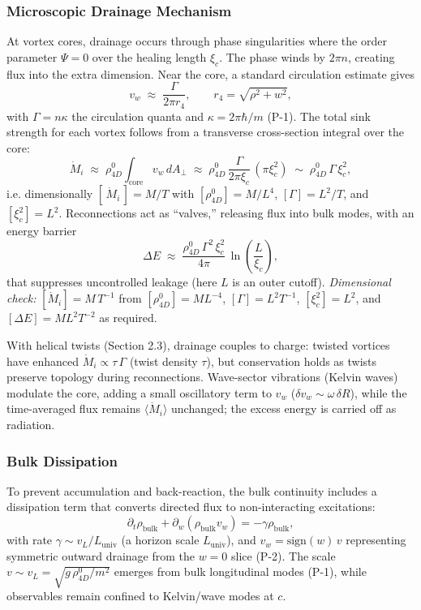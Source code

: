 \subsubsection{Microscopic Drainage Mechanism}
At vortex cores, drainage occurs through phase singularities where the order parameter $\Psi=0$ over the healing length $\xi_c$. The phase winds by $2\pi n$, creating flux into the extra dimension. Near the core, a standard circulation estimate gives
\begin{equation}
v_w \;\approx\; \frac{\Gamma}{2\pi r_4},\qquad r_4=\sqrt{\rho^2+w^2},
\end{equation}
with $\Gamma=n\kappa$ the circulation quanta and $\kappa=2\pi\hbar/m$ (P-1). The total sink strength for each vortex follows from a transverse cross-section integral over the core:
\begin{equation}
\dot M_i \;\approx\; \rho_{4D}^0 \int_{\text{core}} v_w\, dA_\perp
\;\approx\; \rho_{4D}^0\,\frac{\Gamma}{2\pi \xi_c}\,(\pi \xi_c^2)
\;\sim\; \rho_{4D}^0\,\Gamma\,\xi_c^2,
\end{equation}
i.e. dimensionally $[\,\dot M_i\,]=M/T$ with $[\rho_{4D}^0]=M/L^4$, $[\Gamma]=L^2/T$, and $[\xi_c^2]=L^2$. Reconnections act as ``valves,'' releasing flux into bulk modes, with an energy barrier
\begin{equation}
\Delta E \;\approx\; \frac{\rho_{4D}^0\,\Gamma^2\,\xi_c^2}{4\pi}\,\ln\!\left(\frac{L}{\xi_c}\right),
\end{equation}
that suppresses uncontrolled leakage (here $L$ is an outer cutoff).
\emph{Dimensional check:}\; $[\dot M_i]=M\,T^{-1}$ from $[\rho_{4D}^0]=M L^{-4}$, $[\Gamma]=L^{2}T^{-1}$, $[\xi_c^2]=L^2$, and $[\Delta E]=M L^2 T^{-2}$ as required.

With helical twists (Section 2.3), drainage couples to charge: twisted vortices have enhanced $\dot M_i \propto \tau\,\Gamma$ (twist density $\tau$), but conservation holds as twists preserve topology during reconnections. Wave-sector vibrations (Kelvin waves) modulate the core, adding a small oscillatory term to $v_w$ ($\delta v_w \sim \omega\,\delta R$), while the time-averaged flux remains $\langle \dot M_i \rangle$ unchanged; the excess energy is carried off as radiation.

\subsubsection{Bulk Dissipation}
To prevent accumulation and back-reaction, the bulk continuity includes a dissipation term that converts directed flux to non-interacting excitations:
\begin{equation}
\partial_t \rho_{\text{bulk}} + \partial_w (\rho_{\text{bulk}} v_w) = -\gamma \rho_{\text{bulk}},
\end{equation}
with rate $\gamma \sim v_L/L_{\text{univ}}$ (a horizon scale $L_{\text{univ}}$), and $v_w=\mathrm{sign}(w)\,v$ representing symmetric outward drainage from the $w=0$ slice (P-2). The scale $v \sim v_L=\sqrt{g\,\rho_{4D}^0/m^{2}}$ emerges from bulk longitudinal modes (P-1), while observables remain confined to Kelvin/wave modes at $c$.

